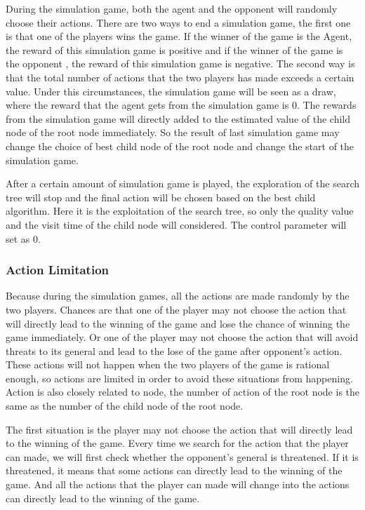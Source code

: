 During the simulation game, both the agent and the opponent will randomly choose their actions. 
There are two ways to end a simulation game, the first one is that one of the players wins the game. 
If the winner of the game is the Agent, the reward of this simulation game is positive and if the winner of the game is the opponent , the reward of this simulation game is negative. 
The second way is that the total number of actions that the two players has made exceeds a certain value. 
Under this circumstances, the simulation game will be seen as a draw, where the reward that the agent gets from the simulation game is 0. 
The rewards from the simulation game will directly added to the estimated value of the child node of the root node immediately. 
So the result of last simulation game may change the choice of best child node of the root node and change the start of the simulation game. 

After a certain amount of simulation game is played, the exploration of the search tree will stop and the final action will be chosen based on the best child algorithm. 
Here it is the exploitation of the search tree, so only the quality value and the visit time of the child node will considered. 
The control parameter will set as 0. 

\subsubsection{Action Limitation}
Because during the simulation games, all the actions are made randomly by the two players. 
Chances are that one of the player may not choose the action that will directly lead to the winning of the game and lose the chance of winning the game immediately. 
Or one of the player may not choose the action that will avoid threats to its general and lead to the lose of the game after opponent's action. 
These actions will not happen when the two players of the game is rational enough, so actions are limited in order to avoid these situations from happening. 
Action is also closely related to node, the number of action of the root node is the same as the number of the child node of the root node. 

The first situation is the player may not choose the action that will directly lead to the winning of the game. 
Every time we search for the action that the player can made, we will first check whether the opponent's general is threatened. 
If it is threatened, it means that some actions can directly lead to the winning of the game. 
And all the actions that the player can made will change into the actions can directly lead to the winning of the game. 


